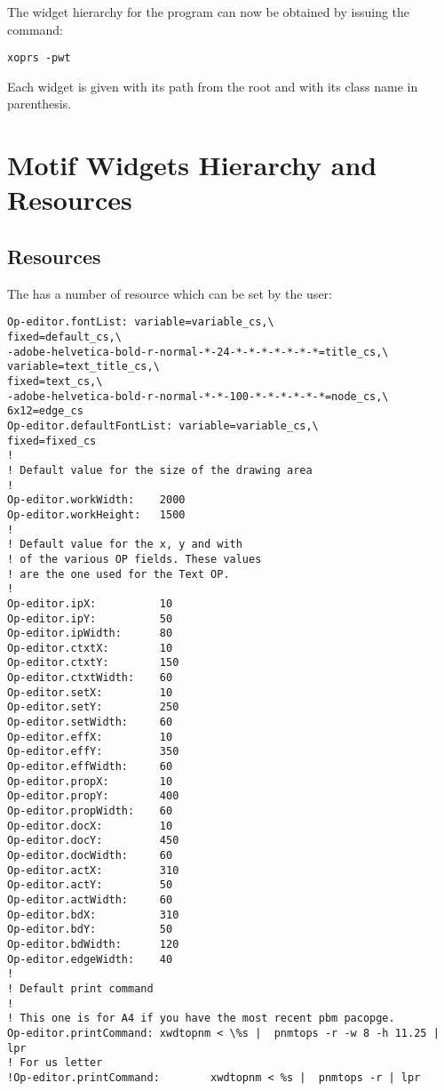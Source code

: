The widget hierarchy for the \XOPRS{} program can now be obtained by issuing
the command:

\begin{verbatim}
xoprs -pwt
\end{verbatim}

Each widget is given with its path from the root and with its class name in
parenthesis.

\section{\OPE{} Motif Widgets Hierarchy and Resources}



\subsection{\OPE{} Resources}

The \OPE{} has a number of resource which can be set by the user:

\begin{verbatim}
Op-editor.fontList: variable=variable_cs,\
fixed=default_cs,\
-adobe-helvetica-bold-r-normal-*-24-*-*-*-*-*-*-*=title_cs,\
variable=text_title_cs,\
fixed=text_cs,\
-adobe-helvetica-bold-r-normal-*-*-100-*-*-*-*-*-*=node_cs,\
6x12=edge_cs
Op-editor.defaultFontList: variable=variable_cs,\
fixed=fixed_cs
!
! Default value for the size of the drawing area 
!
Op-editor.workWidth:    2000
Op-editor.workHeight:   1500
!
! Default value for the x, y and with
! of the various OP fields. These values
! are the one used for the Text OP.
!
Op-editor.ipX:          10
Op-editor.ipY:          50
Op-editor.ipWidth:      80
Op-editor.ctxtX:        10
Op-editor.ctxtY:        150
Op-editor.ctxtWidth:    60
Op-editor.setX:         10
Op-editor.setY:         250
Op-editor.setWidth:     60
Op-editor.effX:         10
Op-editor.effY:         350
Op-editor.effWidth:     60
Op-editor.propX:        10
Op-editor.propY:        400
Op-editor.propWidth:    60
Op-editor.docX:         10
Op-editor.docY:         450
Op-editor.docWidth:     60
Op-editor.actX:         310
Op-editor.actY:         50
Op-editor.actWidth:     60
Op-editor.bdX:          310
Op-editor.bdY:          50
Op-editor.bdWidth:      120
Op-editor.edgeWidth:    40
!
! Default print command
!
! This one is for A4 if you have the most recent pbm pacopge.
Op-editor.printCommand: xwdtopnm < \%s |  pnmtops -r -w 8 -h 11.25 | lpr
! For us letter
!Op-editor.printCommand:        xwdtopnm < %s |  pnmtops -r | lpr
\end{verbatim}

